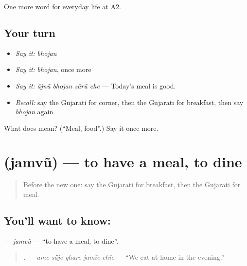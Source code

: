 \begin{grammarlens}[title={What you've built}]
One more word for everyday life at A2.
\end{grammarlens}

\subsection*{Your turn}
\begin{itemize}
\raggedright
  \item \emph{Say it:} \emph{bhojan}
  \item \emph{Say it:} \emph{bhojan}, once more
  \item \emph{Say it:} \emph{ājnũ bhojan sārũ che} — Today's meal is good.
  \item \emph{Recall:} say the Gujarati for corner, then the Gujarati for breakfast, then say \emph{bhojan} again
\end{itemize}

\begin{tcolorbox}[breakable,colback=teal!4,colframe=teal!35!black,title={Before you move on}]
What does  mean? (\textquotedblleft{}Meal, food\textquotedblright{}.) Say it once more.
\end{tcolorbox}
\section[\texorpdfstring{\gu{જમવું} (jamvũ)}{જમવું (jamvũ)}]{ (jamvũ) — to have a meal, to dine}

\label{lesson:GU-C163-jamvu}



\begin{quote}
Before the new one: say the Gujarati for breakfast, then the Gujarati for meal.
\end{quote}

\subsection*{You'll want to know: }
\textbf{} — \emph{jamvũ} — \textquotedblleft{}to have a meal, to dine\textquotedblright{}.

\begin{quote}
\textbf{    .} — \emph{ame sā̃je ghare jamīe chīe} — \textquotedblleft{}We eat at home in the evening.\textquotedblright{}
\end{quote}


